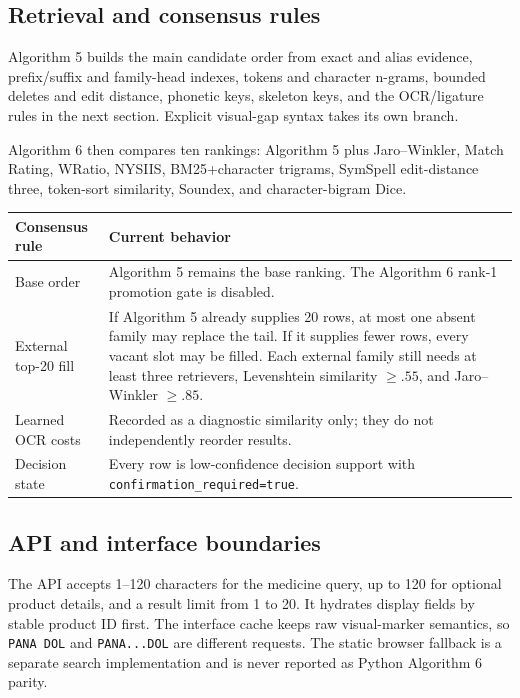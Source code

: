 \documentclass[10pt,a4paper]{article}
\newcommand{\observed}[1]{\texttt{#1}}
\begin{document}
\subsection{Retrieval and consensus rules}

Algorithm 5 builds the main candidate order from exact and alias evidence,
prefix/suffix and family-head indexes, tokens and character n-grams, bounded
deletes and edit distance, phonetic keys, skeleton keys, and the OCR/ligature
rules in the next section. Explicit visual-gap syntax takes its own branch.

{\RaggedRight Algorithm 6 then compares ten rankings: Algorithm 5 plus Jaro--Winkler,
Match Rating, WRatio, NYSIIS, BM25+character trigrams, SymSpell edit-distance
three, token-sort similarity, Soundex, and character-bigram Dice.
\par}

\begin{tabularx}{\textwidth}{@{}L{42mm}Y@{}}
\toprule
Consensus rule & Current behavior \\
\midrule
Base order & Algorithm 5 remains the base ranking. The Algorithm 6 rank-1 promotion gate is disabled. \\
External top-20 fill & If Algorithm 5 already supplies 20 rows, at most one absent family may replace the tail. If it supplies fewer rows, every vacant slot may be filled. Each external family still needs at least three retrievers, Levenshtein similarity $\geq .55$, and Jaro--Winkler $\geq .85$. \\
Learned OCR costs & Recorded as a diagnostic similarity only; they do not independently reorder results. \\
Decision state & Every row is low-confidence decision support with \texttt{confirmation\_required=true}. \\
\bottomrule
\end{tabularx}

\subsection{API and interface boundaries}

The API accepts 1--120 characters for the medicine query, up to 120 for
optional product details, and a result limit from 1 to 20. It hydrates display
fields by stable product ID first. The interface cache keeps raw visual-marker
semantics, so \observed{PANA DOL} and \observed{PANA...DOL} are different
requests. The static browser fallback is a separate search implementation and
is never reported as Python Algorithm 6 parity.
\end{document}
